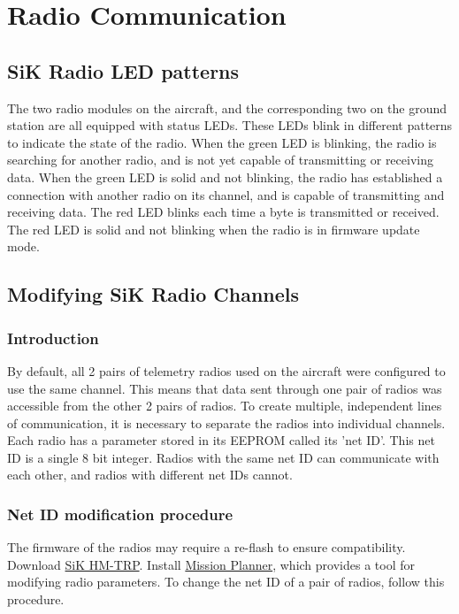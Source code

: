 \documentclass[12pt,journal,compsoc]{IEEEtran}
\begin{document}
\section{Radio Communication}
\subsection{SiK Radio LED patterns}
The two radio modules on the aircraft, and the corresponding two on the ground station are all equipped with status LEDs. These LEDs blink in different patterns to indicate the state of the radio. When the green LED is blinking, the radio is searching for another radio, and is not yet capable of transmitting or receiving data. When the green LED is solid and not blinking, the radio has established a connection with another radio on its channel, and is capable of transmitting and receiving data. The red LED blinks each time a byte is transmitted or received. The red LED is solid and not blinking when the radio is in firmware update mode. 

\subsection{Modifying SiK Radio Channels}
\subsubsection{Introduction}
By default, all 2 pairs of telemetry radios used on the aircraft were configured to use the same channel. This means that data sent through one pair of radios was accessible from the other 2 pairs of radios. To create multiple, independent lines of communication, it is necessary to separate the radios into individual channels. Each radio has a parameter stored in its EEPROM called its 'net ID'. This net ID is a single 8 bit integer. Radios with the same net ID can communicate with each other, and radios with different net IDs cannot. 
\subsubsection{Net ID modification procedure}
The firmware of the radios may require a re-flash to ensure compatibility. Download 
\href{https://drive.google.com/open?id=17GBNzsjTxYfQuoexLm5VmItGezQfW7dR}{SiK HM-TRP}. Install \href{http://ardupilot.org/planner/}{Mission Planner}, which provides a tool for modifying radio parameters. To change the net ID of a pair of radios, follow this procedure.
\end{document}
